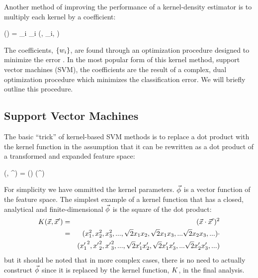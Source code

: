 Another method of improving the performance of a kernel-density estimator
is to multiply each kernel by a coefficient:
\begin{eqnnon}
	\densityestimator(\testpoint) = \sum_i \svmcoeff_i \vectorkernel(\testpoint, \sample_i, )
	\label{weighted_kernel_estimator}
\end{eqnnon}
The coefficients, $\lbrace w_i \rbrace$, are found through an optimization
procedure designed to minimize the error \citep{Chen_etal2015}. In the most popular
form of this kernel method, support vector machines (SVM), the coefficients
are the result of a complex, dual optimization procedure which minimizes
the classification error. We will briefly outline this procedure.

\subsection{Support Vector Machines}

The basic ``trick'' of kernel-based SVM methods is to replace a dot product
with the kernel function in the assumption that it can be rewritten
as a dot product of a transformed and expanded feature space:
\begin{eqnnon}
	\vectorkernel(\point, \point^\prime) = \expandedspace(\point) \cdot \expandedspace(\point^\prime)
	\label{phi_def}
\end{eqnnon}
For simplicity we have ommitted the kernel parameters.
$\vec\phi$ is a vector function of the feature space.
The simplest example of a kernel function that has a closed, analytical and
finite-dimensional $\vec\phi$ is the square of the dot product:
\begin{eqnarray}
	K(\vec {x}, \vec {x}^\prime) & = & (\vec {x} \cdot \vec {x}^\prime)^2 \\ \nonumber
					 & = & (x_1^2, x_2^2, x_3^2, ..., \sqrt{2} x_1 x_2, \sqrt{2} x_1 x_3, ... \sqrt{2} x_2 x_3, ...) \cdot \\ \nonumber
      & &	 ({x^\prime_1}^2, {x^\prime}_2^2, {x^\prime}_3^2, ..., \sqrt{2} x^\prime_1 x^\prime_2, \sqrt{2} x^\prime_1 x^\prime_3, ... \sqrt{2} x^\prime_2 x^\prime_3, ...) 
\end{eqnarray}
but it should be noted that in more complex cases, 
there is no need to actually construct $\vec\phi$ since it is replaced by the 
kernel function, $K$, in the final analysis.

